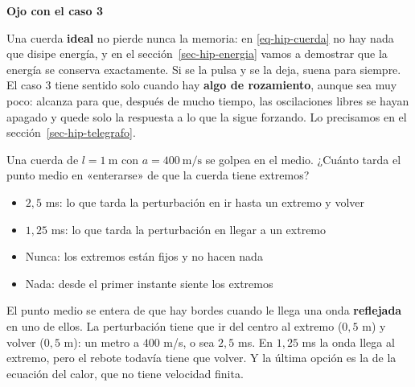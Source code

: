 \documentclass[
  spanish,
  a4paper,
]{scrbook}
\providecommand{\tightlist}{%
  \setlength{\itemsep}{0pt}\setlength{\parskip}{0pt}}
\theoremstyle{definition}
\theoremstyle{plain}
\theoremstyle{definition}
\theoremstyle{plain}
\theoremstyle{definition}
\theoremstyle{remark}
\begin{document}
\begin{tcolorbox}[enhanced jigsaw, arc=.35mm, bottomrule=.15mm, breakable, colback=white, colframe=quarto-callout-warning-color-frame, left=2mm, leftrule=.75mm, opacityback=0, rightrule=.15mm, toprule=.15mm]
\begin{minipage}[t]{5.5mm}
\textcolor{quarto-callout-warning-color}{\faExclamationTriangle}
\end{minipage}%
\begin{minipage}[t]{\textwidth - 5.5mm}

\vspace{-3mm}\textbf{Ojo con el caso 3}\vspace{3mm}

Una cuerda \textbf{ideal} no pierde nunca la memoria: en
\ref{eq-hip-cuerda} no hay nada que disipe energía, y en el
sección~\ref{sec-hip-energia} vamos a demostrar que la energía se
conserva exactamente. Si se la pulsa y se la deja, suena para siempre.
El caso 3 tiene sentido solo cuando hay \textbf{algo de rozamiento},
aunque sea muy poco: alcanza para que, después de mucho tiempo, las
oscilaciones libres se hayan apagado y quede solo la respuesta a lo que
la sigue forzando. Lo precisamos en el sección~\ref{sec-hip-telegrafo}.

\end{minipage}%
\end{tcolorbox}

Una cuerda de \(l = 1\ \text{m}\) con \(a = 400\ \text{m/s}\) se golpea
en el medio. ¿Cuánto tarda el punto medio en «enterarse» de que la
cuerda tiene extremos?

\begin{itemize}
\tightlist
\item
  {\(2{,}5\) ms: lo que tarda la perturbación en ir hasta un extremo y
  volver}
\item
  {\(1{,}25\) ms: lo que tarda la perturbación en llegar a un extremo}
\item
  {Nunca: los extremos están fijos y no hacen nada}
\item
  {Nada: desde el primer instante siente los extremos}
\end{itemize}

El punto medio se entera de que hay bordes cuando le llega una onda
\textbf{reflejada} en uno de ellos. La perturbación tiene que ir del
centro al extremo (\(0{,}5\) m) y volver (\(0{,}5\) m): un metro a
\(400\) m/s, o sea \(2{,}5\) ms. En \(1{,}25\) ms la onda llega al
extremo, pero el rebote todavía tiene que volver. Y la última opción es
la de la ecuación del calor, que no tiene velocidad finita.
\end{document}
